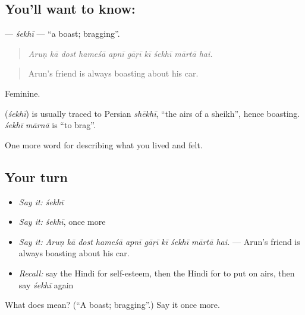 \subsection*{You'll want to know: }
\textbf{} — \emph{śekhī} — \textquotedblleft{}a boast; bragging\textquotedblright{}.

\begin{quote}
         
\end{quote}

\begin{quote}
\emph{Aruṇ kā dost hameśā apnī gāṛī kī śekhī mārtā hai.}
\end{quote}

\begin{quote}
Arun's friend is always boasting about his car.
\end{quote}

Feminine.

\begin{cousinweb}
\textbf{} (\emph{śekhī}) is usually traced to Persian \emph{shēkhī}, \textquotedblleft{}the airs of a sheikh\textquotedblright{}, hence boasting. \emph{śekhī mārnā} is \textquotedblleft{}to brag\textquotedblright{}.
\end{cousinweb}

\begin{grammarlens}[title={What you've built}]
One more word for describing what you lived and felt.
\end{grammarlens}

\subsection*{Your turn}
\begin{itemize}
\raggedright
  \item \emph{Say it:} \emph{śekhī}
  \item \emph{Say it:} \emph{śekhī}, once more
  \item \emph{Say it:} \emph{Aruṇ kā dost hameśā apnī gāṛī kī śekhī mārtā hai.} — Arun's friend is always boasting about his car.
  \item \emph{Recall:} say the Hindi for self-esteem, then the Hindi for to put on airs, then say \emph{śekhī} again
\end{itemize}

\begin{tcolorbox}[breakable,colback=teal!4,colframe=teal!35!black,title={Before you move on}]
What does  mean? (\textquotedblleft{}A boast; bragging\textquotedblright{}.) Say it once more.
\end{tcolorbox}
